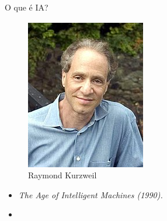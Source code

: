 \begin{frame}{O que é IA?}
    \begin{minipage}{0.5\linewidth}
        \begin{figure}
            \centering
            \includegraphics[width=0.5\linewidth]{imagens//secao1/kurzweil.png}
            \caption{Raymond Kurzweil}
        \end{figure}
    \end{minipage}
    \begin{minipage}{0.5\linewidth}
        \begin{itemize}
        \justifying
            \item \textit{The Age of Intelligent Machines (1990).}
            \item 
        \end{itemize}
    \end{minipage}
\end{frame}

